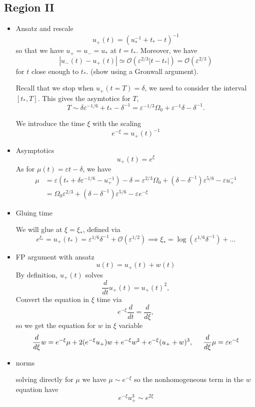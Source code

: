 \documentclass[letterpaper,11pt]{article}
\newcommand{\rmO}{\mathcal{O}}
\newcommand{\eps}{\varepsilon}
\numberwithin{equation}{section}
\theoremstyle{plain}
\begin{document}
\subsection{Region II}
\begin{itemize}
\item Ansatz and rescale
\[
u_+(t) = (u_*^{-1} +t_*-t)^{-1}
\]
so that we have $u_+ = u_- = u_*$ at $t=t_*$. Moreover, we have
\[
|u_-(t)-u_+(t)| \simeq \rmO(\eps^{2/3}|t-t_*|)=\rmO(\eps^{2/3})
\]
for $t$ close enough to $t_*$. (show using a Gronwall argument).

Recall that we stop when $u_+(t=T)=\delta$, we need to consider the interval $[t_*, T]$. This gives the asymtotics for $T$,
\[
T \sim \delta\eps^{-1/6} + t_* -\delta^{-1} = \eps^{-1/3}\Omega_0 +\eps^{-1}\delta -\delta^{-1}.
\]

We introduce the time $\xi$ with the scaling
\[
e^{-\xi} = u_+(t)^{-1}
\]
\item Asymptotics
\begin{equation*}
u_+(t) =e^\xi
\end{equation*}
As for $\mu(t) = \eps t -\delta$, we have
\begin{align*}
\mu &= \eps(t_*+\delta\eps^{-1/6}-u_+^{-1}) -\delta = \eps^{2/3}\Omega_0 +(\delta-\delta^{-1})\eps^{5/6} -\eps u_+^{-1}\\
&=\Omega_0\eps^{2/3} +(\delta-\delta^{-1})\eps^{5/6}-\eps e^{-\xi}
\end{align*}


\item Gluing time


We will glue at $\xi = \xi_*$, defined via
\[
e^{\xi_*} = u_+(t_*) = \eps^{1/6}\delta^{-1} +\rmO(\eps^{1/2})\implies \xi_* = \log (\eps^{1/6}\delta^{-1})+...
\]

\item FP argument with ansatz
\[
u(t) = u_+(t) +w(t)
\]
By definition, $u_+(t)$ solves 
\[
\frac{d}{dt} u_+(t) = u_+(t)^2,
\]
Convert the equation in $\xi$ time via 
\[
e^{-\xi}\frac{d}{dt}  = \frac{d}{d\xi},
\]
so we get the equation for $w$ in $\xi$ variable
\[
\frac{d}{d\xi} w = e^{-\xi}\mu +2(e^{-\xi}u_+) w +e^{-\xi}w^2+e^{-\xi}(u_++w)^3, \hspace{0.2in} \frac{d}{d\xi} \mu = \eps e^{-\xi}
\]

\item norms

solving directly for $\mu$ we have $\mu \sim e^{-\xi}$ so the nonhomogeneous term in the $w$ equation have
\[ 
e^{-\xi}u_+^3 \sim e^{2\xi}
\]


\end{itemize}
\end{document}
